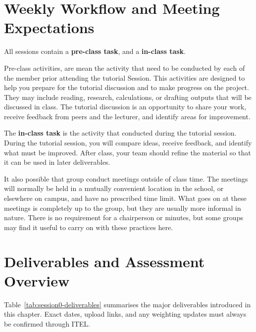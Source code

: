 \section{Weekly Workflow and Meeting Expectations}

All sessions contain a \textbf{pre-class task}, and a \textbf{in-class task}. 

Pre-class activities, are mean the activity that need to be conducted by each of the member prior attending the tutorial Session. This activities are designed to help you prepare for the tutorial discussion and to make progress on the project. They may include reading, research, calculations, or drafting outputs that will be discussed in class. The tutorial discussion is an opportunity to share your work, receive feedback from peers and the lecturer, and identify areas for improvement. 

The \textbf{in-class task} is the activity that conducted during the tutorial session. During the tutorial session, you will compare ideas, receive feedback, and identify what must be improved. After class, your team should refine the material so that it can be used in later deliverables.

It also possible that group conduct meetings outside of class time. The meetings will normally be held in a mutually convenient location in the school, or elsewhere on campus, and have no prescribed time limit. What goes on at these meetings is completely up to the group, but they are usually more informal in nature. There is no requirement for a chairperson or minutes, but some groups may find it useful to carry on with these practices here.



\section{Deliverables and Assessment Overview}

Table~\ref{tab:session0-deliverables} summarises the major deliverables introduced in this chapter. Exact dates, upload links, and any weighting updates must always be confirmed through ITEL.

